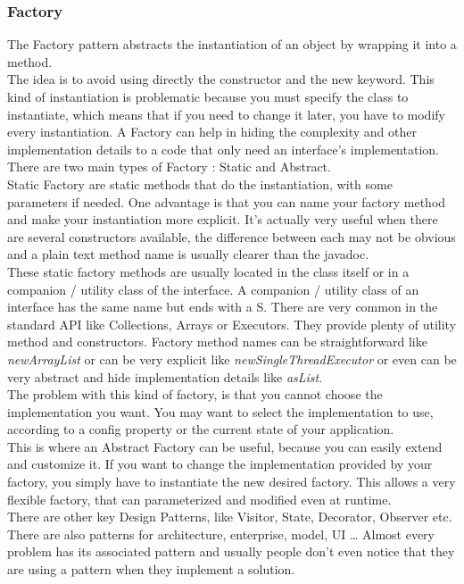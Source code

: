 \subsubsection{Factory}
The Factory pattern abstracts the instantiation of an object by wrapping
it into a method. \\
The idea is to avoid using directly the constructor and the new keyword.
This kind of instantiation is problematic because you must specify
the class to instantiate, which means that if you need to change it
later, you have to modify every instantiation.
A Factory can help in hiding the complexity and other implementation
details to a code that only need an interface's implementation. \\
There are two main types of Factory : Static and Abstract. \\
\newline
Static Factory are static methods that do the instantiation, with some
parameters if needed.
One advantage is that you can name your factory method and make your
instantiation more explicit.
It's actually very useful when there are several constructors available,
the difference between each may not be obvious and a plain text method
name is usually clearer than the javadoc. \\
\newline
These static factory methods are usually located in the class itself or
in a companion / utility class of the interface.
A companion / utility class of an interface has the same name but ends
with a S\@.
There are very common in the standard API like Collections, Arrays or
Executors.
They provide plenty of utility method and constructors.
Factory method names can be straightforward like \textit{newArrayList}
or can be very explicit like \textit{newSingleThreadExecutor} or even
can be very abstract and hide implementation details like
\textit{asList}. \\
\newline
The problem with this kind of factory, is that you cannot choose the
implementation you want.
You may want to select the implementation to use, according to a config
property or the current state of your application. \\
This is where an Abstract Factory can be useful, because you can easily
extend and customize it.
If you want to change the implementation provided by your factory, you
simply have to instantiate the new desired factory.
This allows a very flexible factory, that can parameterized and modified
even at runtime.\\
\newline
There are other key Design Patterns, like Visitor, State, Decorator,
Observer etc.
There are also patterns for architecture, enterprise, model, UI \ldots
Almost every problem has its associated pattern and usually people don't
even notice that they are using a pattern when they implement a solution.

